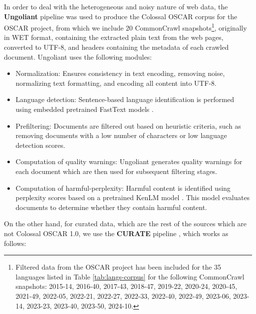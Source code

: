 In order to deal with the heterogeneous and noisy nature of web data, the \textbf{Ungoliant} pipeline \cite{abadji_ungoliant_2021} was used to produce the Colossal OSCAR corpus for the OSCAR project, from which we include 20 CommonCrawl snapshots\footnote{Filtered data from the OSCAR project has been included for the 35 languages listed in Table \ref{tab:langs-corpus} for the following CommonCrawl snapshots: 2015-14, 2016-40, 2017-43, 2018-47, 2019-22, 2020-24, 2020-45, 2021-49, 2022-05, 2022-21, 2022-27, 2022-33, 2022-40, 2022-49, 2023-06, 2023-14, 2023-23, 2023-40, 2023-50, 2024-10.}, originally in WET format, containing the extracted plain text from the web pages, converted to UTF-8, and headers containing the metadata of each crawled document. Ungoliant uses the following modules:

\begin{itemize}
    \item Normalization: Ensures consistency in text encoding, removing noise, normalizing text formatting, and encoding all content into UTF-8.
    \item Language detection: Sentence-based language identification is performed using embedded pretrained FastText models \cite{joulin_bagtrick_2016, joulin_fasttext_2016}.
    \item Prefiltering: Documents are filtered out based on heuristic criteria, such as removing documents with a low number of characters or low language detection scores.
    \item Computation of quality warnings: Ungoliant generates quality warnings for each document which are then used for subsequent filtering stages.
    \item Computation of harmful-perplexity: Harmful content is identified using perplexity scores based on a pretrained KenLM model \cite{jansen_perplexed_2020}. This model evaluates documents to determine whether they contain harmful content.
\end{itemize}

On the other hand, for curated data, which are the rest of the sources which are not Colossal OSCAR 1.0, we use the \textbf{CURATE} pipeline \cite{palomar-giner_curated_2024}, which works as follows:


